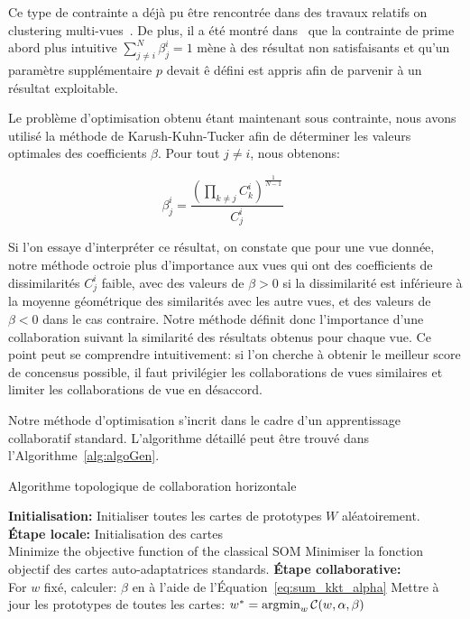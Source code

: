 \documentclass[a4paper]{article}
\begin{document}
Ce type de contrainte a déjà pu \^{e}tre rencontrée dans des travaux relatifs on clustering multi-vues~\cite{CarvalhoML15}. De plus, il a été montré dans~\cite{Sublime2017} que la contrainte de prime abord plus intuitive $\sum_{j \neq i}^N \beta_j^i = 1$ mène à des résultat non satisfaisants et qu'un paramètre supplémentaire $p$ devait \^{e} défini est appris  afin de parvenir à un résultat exploitable.

Le problème d'optimisation obtenu étant maintenant sous contrainte, nous avons utilisé la méthode de Karush-Kuhn-Tucker afin de déterminer les valeurs optimales des coefficients $\beta$. Pour tout $j \neq i$, nous obtenons:

\begin{equation}
\beta_j^i =  \frac{{(\prod_{k\neq j} C_k^i)}^{\frac 1 {N-1}}} {C_j^i} \qquad
\label{eq:sum_kkt_alpha}
\end{equation} 

Si l'on essaye d'interpréter ce résultat, on constate que pour une vue donnée, notre méthode octroie plus d'importance aux vues qui ont des coefficients de dissimilarités $C_j^i$ faible, avec des valeurs de $\beta>0$ si la dissimilarité est inférieure à la moyenne géométrique des similarités avec les autre vues, et des valeurs de $\beta<0$ dans le cas contraire. Notre méthode définit donc l'importance d'une collaboration suivant la similarité des résultats obtenus pour chaque vue. Ce point peut se comprendre intuitivement: si l'on cherche à obtenir le meilleur score de concensus possible, il faut privilégier les collaborations de vues similaires et limiter les collaborations de vue en désaccord.

Notre méthode d'optimisation s'incrit dans le cadre d'un apprentissage collaboratif standard. L'algorithme détaillé peut \^{e}tre trouvé dans l'Algorithme~\ref{alg:algoGen}.

\begin{algorithm}[!h]
\label{alg:algoGen}
\SetAlgoLined{}
	\vspace{0.05cm}
	\caption{Algorithme topologique de collaboration horizontale}
	\vspace{0.05cm}
	\textbf{Initialisation:} Initialiser toutes les cartes de prototypes $W$ aléatoirement. \\
	\textbf{Étape locale:} Initialisation des cartes\\
	 {
		Minimize the objective function of the classical SOM
        Minimiser la fonction objectif des cartes auto-adaptatrices standards.
	} 
	\textbf{Étape collaborative:}\\
	 {
        For $w$ fixé, calculer:
        $\beta$ en à l'aide de l'Équation~\ref{eq:sum_kkt_alpha}
        Mettre à jour les prototypes de toutes les cartes:
		$ 
		w^{*} =  \operatornamewithlimits{argmin}_{w}\mathcal{C}(w,\alpha,\beta) 
		$
	}	 
\end{algorithm}
\end{document}
